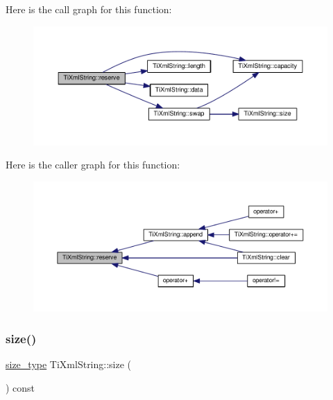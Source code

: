 Here is the call graph for this function\+:\nopagebreak
\begin{figure}[H]
\begin{center}
\leavevmode
\includegraphics[width=350pt]{class_ti_xml_string_a88ecf9f0f00cb5c67b6b637958d7049c_cgraph}
\end{center}
\end{figure}
Here is the caller graph for this function\+:\nopagebreak
\begin{figure}[H]
\begin{center}
\leavevmode
\includegraphics[width=350pt]{class_ti_xml_string_a88ecf9f0f00cb5c67b6b637958d7049c_icgraph}
\end{center}
\end{figure}
\mbox{\label{class_ti_xml_string_a483d85103d2a3ba8c0831e205c832f33}} 
\subsubsection{\texorpdfstring{size()}{size()}}
{\footnotesize\ttfamily \hyperlink{class_ti_xml_string_abeb2c1893a04c17904f7c06546d0b971}{size\+\_\+type} Ti\+Xml\+String\+::size (\begin{DoxyParamCaption}{ }\end{DoxyParamCaption}) const\hspace{0.3cm}{\ttfamily [inline]}}

